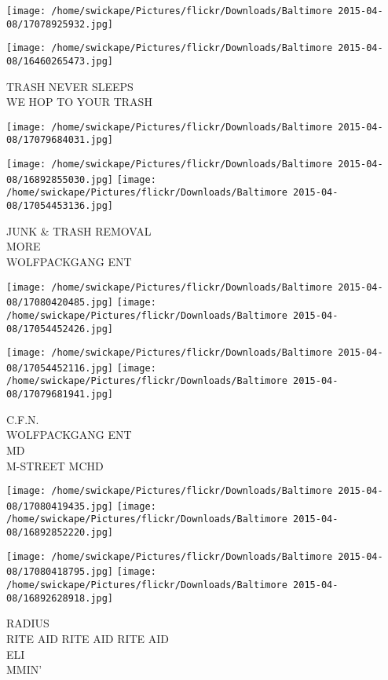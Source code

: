 \documentclass[10pt,letterpaper]{article}
\begin{document}
\texttt{[image: /home/swickape/Pictures/flickr/Downloads/Baltimore 2015-04-08/17078925932.jpg]}

\vspace{0.25in}
\texttt{[image: /home/swickape/Pictures/flickr/Downloads/Baltimore 2015-04-08/16460265473.jpg]}

TRASH NEVER SLEEPS\\
WE HOP TO YOUR TRASH\\
\pagebreak

\texttt{[image: /home/swickape/Pictures/flickr/Downloads/Baltimore 2015-04-08/17079684031.jpg]}

\vspace{0.25in}
\texttt{[image: /home/swickape/Pictures/flickr/Downloads/Baltimore 2015-04-08/16892855030.jpg]}
\texttt{[image: /home/swickape/Pictures/flickr/Downloads/Baltimore 2015-04-08/17054453136.jpg]}

JUNK \& TRASH REMOVAL\\
MORE\\
WOLFPACKGANG ENT\\
\pagebreak

\texttt{[image: /home/swickape/Pictures/flickr/Downloads/Baltimore 2015-04-08/17080420485.jpg]}
\texttt{[image: /home/swickape/Pictures/flickr/Downloads/Baltimore 2015-04-08/17054452426.jpg]}

\texttt{[image: /home/swickape/Pictures/flickr/Downloads/Baltimore 2015-04-08/17054452116.jpg]}
\texttt{[image: /home/swickape/Pictures/flickr/Downloads/Baltimore 2015-04-08/17079681941.jpg]}

C.F.N.\\
WOLFPACKGANG ENT\\
MD\\
M{-}STREET MCHD\\
\pagebreak

\texttt{[image: /home/swickape/Pictures/flickr/Downloads/Baltimore 2015-04-08/17080419435.jpg]}
\texttt{[image: /home/swickape/Pictures/flickr/Downloads/Baltimore 2015-04-08/16892852220.jpg]}

\texttt{[image: /home/swickape/Pictures/flickr/Downloads/Baltimore 2015-04-08/17080418795.jpg]}
\texttt{[image: /home/swickape/Pictures/flickr/Downloads/Baltimore 2015-04-08/16892628918.jpg]}

RADIUS\\
RITE AID RITE AID RITE AID\\
ELI\\
MMIN'\\
\pagebreak
\end{document}
